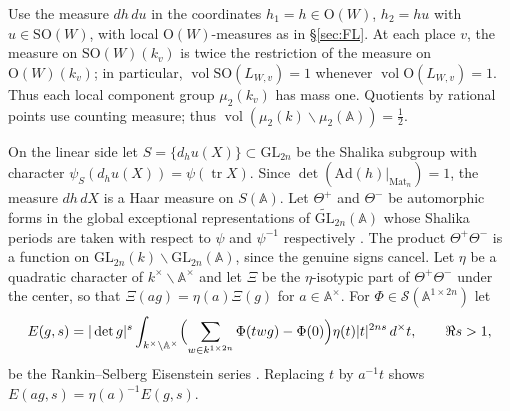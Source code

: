 \documentclass[11pt,oneside,notitlepage]{book}
\numberwithin{equation}{section}
\theoremstyle{plain}
\theoremstyle{definition}
\newcommand{\A}{\mathbb{A}}
\newcommand{\GL}{\mathrm{GL}}
\newcommand{\SO}{\mathrm{SO}}
\newcommand{\Ort}{\mathrm{O}}
\newcommand{\Mat}{\mathrm{Mat}}
\newcommand{\cS}{\mathcal{S}}
\newcommand{\tGL}{\widetilde{\GL}}
\newcommand{\tr}{\operatorname{tr}}
\newcommand{\vol}{\operatorname{vol}}
\begin{document}
Use the measure $dh\,du$ in the coordinates $h_1=h\in\Ort(W)$, $h_2=hu$ with $u\in\SO(W)$, with local $\Ort(W)$-measures as in \S\ref{sec:FL}. At each place $v$, the measure on $\SO(W)(k_v)$ is twice the restriction of the measure on $\Ort(W)(k_v)$; in particular, $\vol\SO(L_{W,v})=1$ whenever $\vol\Ort(L_{W,v})=1$. Thus each local component group $\mu_2(k_v)$ has mass one. Quotients by rational points use counting measure; thus $\vol(\mu_2(k)\backslash\mu_2(\A))=\tfrac12$.


On the linear side let $S=\{d_hu(X)\}\subset\GL_{2n}$ be the Shalika subgroup with character $\psi_S(d_hu(X))=\psi(\tr X)$. Since $\det(\mathrm{Ad}(h)|_{\Mat_n})=1$, the measure $dh\,dX$ is a Haar measure on $S(\A)$. Let $\Theta^+$ and $\Theta^-$ be automorphic forms in the global exceptional representations of $\tGL_{2n}(\A)$ whose Shalika periods are taken with respect to $\psi$ and $\psi^{-1}$ respectively \cite[\S4]{KM}. The product $\Theta^+\Theta^-$ is a function on $\GL_{2n}(k)\backslash\GL_{2n}(\A)$, since the genuine signs cancel. Let $\eta$ be a quadratic character of $k^\times\backslash\A^\times$ and let $\Xi$ be the $\eta$-isotypic part of $\Theta^+\Theta^-$ under the center, so that $\Xi(ag)=\eta(a)\Xi(g)$ for $a\in\A^\times$. For $\Phi\in\cS(\A^{1\times 2n})$ let
\begin{equation}\label{eq:eisenstein}
E(g,s)=|\det g|^s\int_{k^\times\backslash\A^\times}\Bigl(\sum_{w\in k^{1\times 2n}}\Phi(twg)-\Phi(0)\Bigr)\eta(t)|t|^{2ns}\,d^\times t,\qquad \Re s>1,
\end{equation}
be the Rankin--Selberg Eisenstein series \cite[Lecture 5, Proposition 5.4]{Cogdell}. Replacing $t$ by $a^{-1}t$ shows $E(ag,s)=\eta(a)^{-1}E(g,s)$.
\end{document}
